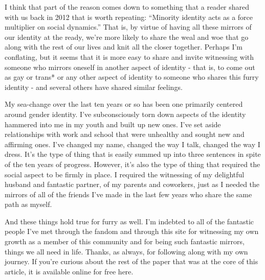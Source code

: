 I think that part of the reason comes down to something that a reader shared with us back in 2012 that is worth repeating: ``Minority identity acts as a force multiplier on social dynamics.'' That is, by virtue of having all these mirrors of our identity at the ready, we're more likely to share the weal and woe that go along with the rest of our lives and knit all the closer together. Perhaps I'm conflating, but it seems that it is more easy to share and invite witnessing with someone who mirrors oneself in another aspect of identity - that is, to come out as gay or trans* or any other aspect of identity to someone who shares this furry identity - and several others have shared similar feelings.

My sea-change over the last ten years or so has been one primarily centered around gender identity. I've subconsciously torn down aspects of the identity hammered into me in my youth and built up new ones. I've set aside relationships with work and school that were unhealthy and sought new and affirming ones. I've changed my name, changed the way I talk, changed the way I dress. It's the type of thing that is easily summed up into three sentences in spite of the ten years of progress. However, it's also the type of thing that required the social aspect to be firmly in place. I required the witnessing of my delightful husband and fantastic partner, of my parents and coworkers, just as I needed the mirrors of all of the friends I've made in the last few years who share the same path as myself.

And these things hold true for furry as well. I'm indebted to all of the fantastic people I've met through the fandom and through this site for witnessing my own growth as a member of this community and for being such fantastic mirrors, things we all need in life. Thanks, as always, for following along with my own journey. If you're curious about the rest of the paper that was at the core of this article, it is available online for free here.
